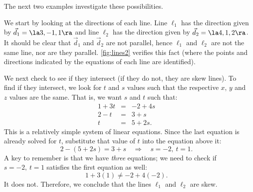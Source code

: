 The next two examples investigate these possibilities.

{We start by looking at the directions of each line. Line $\ell_1$ has the direction given by $\vec d_1=\la 3,-1,1\ra$ and line $\ell_2$ has the direction given by $\vec d_2 = \la 4,1,2\ra$. It should be clear that $\vec d_1$ and $\vec d_2$ are not parallel, hence $\ell_1$ and $\ell_2$ are not the same line, nor are they parallel. \autoref{fig:lines2} verifies this fact (where the points and directions indicated by the equations of each line are identified).

We next check to see if they intersect (if they do not, they are skew lines). To find if they intersect, we look for $t$ and $s$ values such that the respective $x$, $y$ and $z$ values are the same. That is, we want $s$ and $t$ such that:
$$\begin{array}{ccc}
1+3t &=&-2+4s\\
2-t&=&3+s\\
t&=&5+2s.\end{array}$$
This is a relatively simple system of linear equations. Since the last equation is already solved for $t$, substitute that value of $t$ into the equation above it:
$$2-(5+2s) = 3+s \quad \Rightarrow \quad s=-2,\ t=1.$$
A key to remember is that we have \emph{three} equations; we need to check if $s=-2,\ t=1$ satisfies the first equation as well:
$$1+3(1) \neq -2+4(-2).$$
It does not. Therefore, we conclude that the lines $\ell_1$ and $\ell_2$ are skew.}

